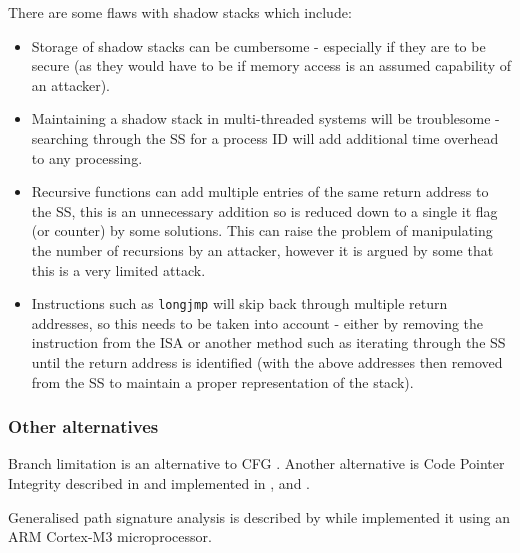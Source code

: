 There are some flaws with shadow stacks which include:
\begin{itemize}
	\item Storage of shadow stacks can be cumbersome - especially if they are to be secure (as they would have to be if memory access is an assumed capability of an attacker).
	\item Maintaining a shadow stack in multi-threaded systems will be troublesome - searching through the SS for a process ID will add additional time overhead to any processing.
	\item Recursive functions can add multiple entries of the same return address to the SS, this is an unnecessary addition so is reduced down to a single it flag (or counter) by some solutions. This can raise the problem of manipulating the number of recursions by an attacker, however it is argued by some that this is a very limited attack.
	\item Instructions such as \verb|longjmp| will skip back through multiple return addresses, so this needs to be taken into account - either by removing the instruction from the ISA or another method such as iterating through the SS until the return address is identified (with the above addresses then removed from the SS to maintain a proper representation of the stack).
\end{itemize}

\subsubsection{Other alternatives}

Branch limitation is an alternative to CFG \cite{He2017} \cite{Corporation2017}.
Another alternative is Code Pointer Integrity described in \cite{Security2017} and implemented in \cite{Kuznetsov:204783},\cite{Mashtizadeh2014} and \cite{Szekeres2013}.

Generalised path signature analysis is described by \cite{Mahmood1988} while \cite{Werner2016} implemented it using an ARM Cortex-M3 microprocessor.